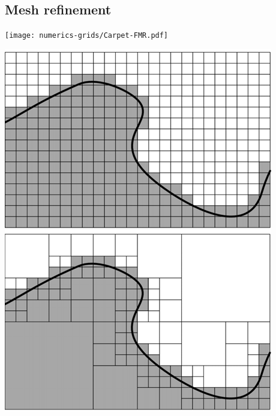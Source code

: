 \subsection{Mesh refinement}\label{sec:mesh-refinement}
\begin{marginfigure}
	\texttt{[image: numerics-grids/Carpet-FMR.pdf]}
	\caption[Carpet FMR region sketch, ]%
	{Multiple Fixed Mesh Refinement layers (FMR) in Carpet, from \cite{Schnetter-etal-03b}}%
	\label{fig:numerics-cactus-fmr}
\end{marginfigure}
%
\begin{marginfigure}
	\includegraphics[width=\textwidth]{numerics-grids/quadtree.png}
	\caption[
	AMR vs unigrid in 2D, cartoon, ]%
	{   Resolving a curve in a unigrid ($16\cdot 24=384$ elements) vs.
		a local mesh refinement (quadtree, $6+12+48+96=166$ elements)
		with the same resolution, but only 43\% storage.
		Adopted from \cite{Sortino2009quadtree}.}\label{fig:amr-motivation}
\end{marginfigure}
